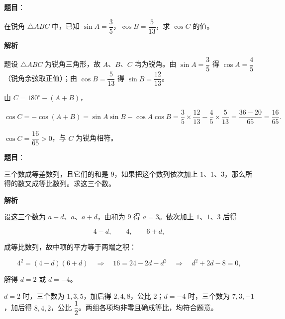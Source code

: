 \begin{answer}

\textbf{题目}：

在锐角 $\triangle ABC$ 中，已知 $\sin A=\dfrac35$，$\cos B=\dfrac5{13}$，求 $\cos C$ 的值。

\textbf{解析}

题设 $\triangle ABC$ 为锐角三角形，故 $A$、$B$、$C$ 均为锐角。由 $\sin A=\dfrac35$ 得 $\cos A=\dfrac45$（锐角余弦取正值）；由 $\cos B=\dfrac5{13}$ 得 $\sin B=\dfrac{12}{13}$。

由 $C=180^\circ-(A+B)$，

\nopagebreak[4]
\[
\cos C=-\cos(A+B)
=\sin A\sin B-\cos A\cos B
=\frac35\times\frac{12}{13}-\frac45\times\frac5{13}
=\frac{36-20}{65}
=\frac{16}{65}.
\]

$\cos C=\dfrac{16}{65}>0$，与 $C$ 为锐角相符。


\end{answer}
\begin{answer}

\textbf{题目}：

三个数成等差数列，且它们的和是 $9$，如果把这个数列依次加上 $1$、$1$、$3$，那么所得的数又成等比数列。求这三个数。

\textbf{解析}

设这三个数为 $a-d$、$a$、$a+d$，由和为 $9$ 得 $a=3$。依次加上 $1$、$1$、$3$ 后得

\nopagebreak[4]
\[
4-d,\qquad 4,\qquad 6+d,
\]

成等比数列，故中项的平方等于两端之积：

\nopagebreak[4]
\[
4^2=(4-d)(6+d)
\quad\Longrightarrow\quad
16=24-2d-d^2
\quad\Longrightarrow\quad
d^2+2d-8=0,
\]

解得 $d=2$ 或 $d=-4$。

$d=2$ 时，三个数为 $1,3,5$，加后得 $2,4,8$，公比 $2$；$d=-4$ 时，三个数为 $7,3,-1$，加后得 $8,4,2$，公比 $\dfrac12$。两组各项均非零且确成等比，均符合题意。


\end{answer}
